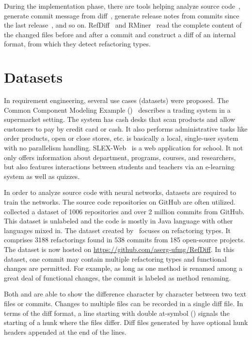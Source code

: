 During the implementation phase, there are tools helping analyze source code~\cite{morgachev2019detection,huo2016learning,gu2016deep},
generate commit message from diff~\cite{linares2015changescribe,buse2010automatically,huang2020learning},
generate release notes from commits since the last release~\cite{moreno2016arena}, and so on.
RefDiff~\cite{silva2020refdiff} and RMiner~\cite{tsantalis2018accurate} read the complete content of the changed files before and after a commit and construct a diff of an internal format, from which they detect refactoring types.


\section{Datasets}
In requirement engineering, several use cases (datasets) were proposed.
The Common Component Modeling Example (\cocome)~\cite{herold2008cocome} describes a trading system in a supermarket setting.
The system has cash desks that scan products and allow customers to pay by credit card or cash. It also performs administrative tasks like order products, open or close stores, etc.
{\cocome} is basically a local, single-user system with no parallelism handling.
SLEX-Web~\cite{jantan2012extension} is a web application for school. It not only offers information about department, programs, courses, and researchers, but also features interactions between students and teachers via an e-learning system as well as quizzes.


In order to analyze source code with neural networks, datasets are required to train the networks. The source code repositories on GitHub are often utilized.
~\cite{jiang2017} collected a dataset of \num{1006} repositories and over 2 million commits from GitHub. This dataset is unlabeled and the code is mostly in Java language with other languages mixed in.
The dataset created by~\cite{tsantalis2018accurate} focuses on refactoring types. It comprises \num{3188} refactorings found in 538 commits from 185 open-source projects. The dataset is now hosted on \url{https://github.com/aserg-ufmg/RefDiff}. In this dataset, one commit may contain multiple refactoring types and functional changes are permitted. For example, as long as one method is renamed among a great deal of functional changes, the commit is labeled as method renaming.

Both {\gnudiff} and {\gitdiff} are able to show the difference character by character between two text files or commits.
Changes to multiple files can be recorded in a single diff file.
In terms of the diff format, a line starting with double at-symbol () signals the starting of a hunk where the files differ.
Diff files generated by {\gitdiff} have optional hunk headers appended at the end of the  lines.



